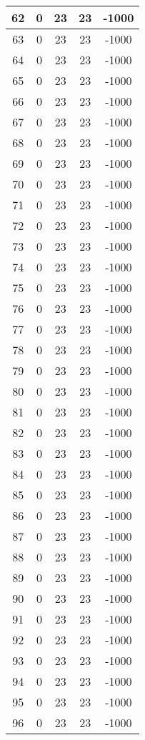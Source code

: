 \documentclass[letterpaper, 12pt]{article}
\begin{document}
\begin{longtable}{|c|c|c|c|c|}
\hline
62 & 0 & 23 & 23 & -1000 \\
\hline
63 & 0 & 23 & 23 & -1000 \\
\hline
64 & 0 & 23 & 23 & -1000 \\
\hline
65 & 0 & 23 & 23 & -1000 \\
\hline
66 & 0 & 23 & 23 & -1000 \\
\hline
67 & 0 & 23 & 23 & -1000 \\
\hline
68 & 0 & 23 & 23 & -1000 \\
\hline
69 & 0 & 23 & 23 & -1000 \\
\hline
70 & 0 & 23 & 23 & -1000 \\
\hline
71 & 0 & 23 & 23 & -1000 \\
\hline
72 & 0 & 23 & 23 & -1000 \\
\hline
73 & 0 & 23 & 23 & -1000 \\
\hline
74 & 0 & 23 & 23 & -1000 \\
\hline
75 & 0 & 23 & 23 & -1000 \\
\hline
76 & 0 & 23 & 23 & -1000 \\
\hline
77 & 0 & 23 & 23 & -1000 \\
\hline
78 & 0 & 23 & 23 & -1000 \\
\hline
79 & 0 & 23 & 23 & -1000 \\
\hline
80 & 0 & 23 & 23 & -1000 \\
\hline
81 & 0 & 23 & 23 & -1000 \\
\hline
82 & 0 & 23 & 23 & -1000 \\
\hline
83 & 0 & 23 & 23 & -1000 \\
\hline
84 & 0 & 23 & 23 & -1000 \\
\hline
85 & 0 & 23 & 23 & -1000 \\
\hline
86 & 0 & 23 & 23 & -1000 \\
\hline
87 & 0 & 23 & 23 & -1000 \\
\hline
88 & 0 & 23 & 23 & -1000 \\
\hline
89 & 0 & 23 & 23 & -1000 \\
\hline
90 & 0 & 23 & 23 & -1000 \\
\hline
91 & 0 & 23 & 23 & -1000 \\
\hline
92 & 0 & 23 & 23 & -1000 \\
\hline
93 & 0 & 23 & 23 & -1000 \\
\hline
94 & 0 & 23 & 23 & -1000 \\
\hline
95 & 0 & 23 & 23 & -1000 \\
\hline
96 & 0 & 23 & 23 & -1000 \\

\end{longtable}
\end{document}
